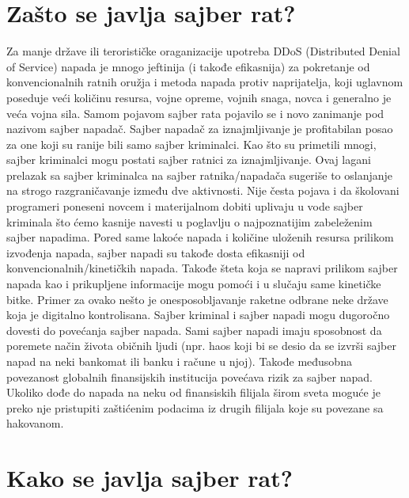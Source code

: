 \documentclass[a4paper]{article}
\begin{document}
{\newpage

 



\section{Zašto se javlja sajber rat?}
\label{slike_i_tabele}


Za manje države ili terorističke oraganizacije upotreba DDoS (Distributed Denial of Service) napada je mnogo jeftinija (i takođe efikasnija) za pokretanje od konvencionalnih ratnih oružja i metoda napada protiv naprijatelja, koji uglavnom poseduje veći količinu resursa, vojne opreme, vojnih snaga, novca i generalno je veća vojna sila. Samom pojavom sajber rata pojavilo se i novo zanimanje pod nazivom sajber napadač. Sajber napadač za iznajmljivanje je profitabilan posao za one koji su ranije bili samo sajber kriminalci.
Kao što su primetili mnogi, sajber kriminalci mogu postati sajber ratnici za iznajmljivanje.
Ovaj lagani prelazak sa sajber kriminalca na sajber ratnika/napadača sugeriše to oslanjanje na strogo razgraničavanje između dve aktivnosti. Nije česta pojava i da školovani programeri poneseni novcem i materijalnom dobiti uplivaju u vode sajber kriminala što ćemo kasnije navesti u poglavlju o najpoznatijim zabeleženim sajber napadima. Pored same lakoće napada i količine uloženih resursa prilikom izvođenja napada, sajber napadi su takođe dosta efikasniji od konvencionalnih/kinetičkih napada. Takođe šteta koja se napravi prilikom sajber napada kao i prikupljene informacije mogu pomoći i u slučaju same kinetičke bitke. Primer za ovako nešto je onesposobljavanje raketne odbrane neke države koja je digitalno kontrolisana.
Sajber kriminal i sajber napadi mogu dugoročno dovesti do povećanja sajber napada.
Sami sajber napadi imaju sposobnost da poremete način života običnih ljudi (npr. haos koji bi se desio da se izvrši sajber napad na neki bankomat ili banku i račune u njoj). Takođe međusobna povezanost globalnih finansijskih institucija povećava rizik za sajber napad.
Ukoliko dođe do napada na neku od finansiskih filijala širom sveta moguće je preko nje pristupiti zaštićenim podacima iz drugih filijala koje su povezane sa hakovanom.








\section{Kako se javlja sajber rat?}
\label{sec:naslov1}


}
\end{document}
